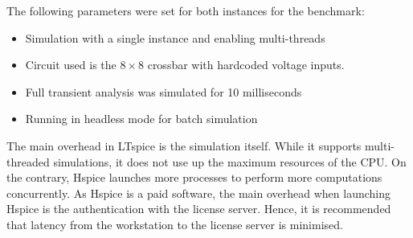 \text{}

\noindent The following parameters were set for both instances for the benchmark:

\begin{itemize}[noitemsep,nolistsep]
    \item    Simulation with a single instance and enabling multi-threads
    \item    Circuit used is the $8 \times 8$ crossbar with hardcoded voltage inputs.
    \item    Full transient analysis was simulated for 10 milliseconds
    \item    Running in headless mode for batch simulation 
\end{itemize}

\text{}

\noindent The main overhead in LTspice is the simulation itself. While it supports multi-threaded simulations, it does not use up the maximum resources of the \ac{CPU}. On the contrary, Hspice launches more processes to perform more computations concurrently. 
As Hspice is a paid software, the main overhead when launching Hspice is the authentication with the license server. Hence, it is recommended that latency from the workstation to the license server is minimised. 

